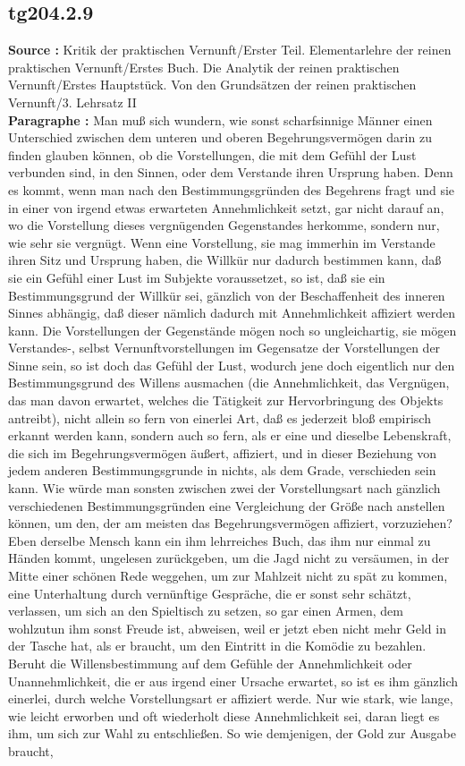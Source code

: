 \documentclass[a4paper,12pt,twoside]{book}
\begin{document}
	\subsection*{tg204.2.9} 
	\textbf{Source : }Kritik der praktischen Vernunft/Erster Teil. Elementarlehre der reinen praktischen Vernunft/Erstes Buch. Die Analytik der reinen praktischen Vernunft/Erstes Hauptstück. Von den Grundsätzen der reinen praktischen Vernunft/3. Lehrsatz II\\  
	
	\noindent\textbf{Paragraphe : }Man muß sich wundern, wie sonst scharfsinnige Männer einen Unterschied zwischen dem unteren und oberen Begehrungsvermögen darin zu finden glauben können, ob die Vorstellungen, die mit dem Gefühl der Lust verbunden sind, in den Sinnen, oder dem Verstande ihren Ursprung haben. Denn es kommt, wenn man nach den Bestimmungsgründen des Begehrens fragt und sie in einer von irgend etwas erwarteten Annehmlichkeit setzt, gar nicht darauf an, wo die Vorstellung dieses vergnügenden Gegenstandes herkomme, sondern nur, wie sehr sie vergnügt. Wenn eine Vorstellung, sie mag immerhin im Verstande ihren Sitz und Ursprung haben, die Willkür nur dadurch bestimmen  kann, daß sie ein Gefühl einer Lust im Subjekte voraussetzet, so ist, daß sie ein Bestimmungsgrund der Willkür sei, gänzlich von der Beschaffenheit des inneren Sinnes abhängig, daß dieser nämlich dadurch mit Annehmlichkeit affiziert werden kann. Die Vorstellungen der Gegenstände mögen noch so ungleichartig, sie mögen Verstandes-, selbst Vernunftvorstellungen im Gegensatze der Vorstellungen der Sinne sein, so ist doch das Gefühl der Lust, wodurch jene doch eigentlich nur den Bestimmungsgrund des Willens ausmachen (die Annehmlichkeit, das Vergnügen, das man davon erwartet, welches die Tätigkeit zur Hervorbringung des Objekts antreibt), nicht allein so fern von einerlei Art, daß es jederzeit bloß empirisch erkannt werden kann, sondern auch so fern, als er eine und dieselbe Lebenskraft, die sich im Begehrungsvermögen äußert, affiziert, und in dieser Beziehung von jedem anderen Bestimmungsgrunde in nichts, als dem Grade, verschieden sein kann. Wie würde man sonsten zwischen zwei der Vorstellungsart nach gänzlich verschiedenen Bestimmungsgründen eine Vergleichung der Größe nach anstellen können, um den, der am meisten das Begehrungsvermögen affiziert, vorzuziehen? Eben derselbe Mensch kann ein ihm lehrreiches Buch, das ihm nur einmal zu Händen kommt, ungelesen zurückgeben, um die Jagd nicht zu versäumen, in der Mitte einer schönen Rede weggehen, um zur Mahlzeit nicht zu spät zu kommen, eine Unterhaltung durch vernünftige Gespräche, die er sonst sehr schätzt, verlassen, um sich an den Spieltisch zu setzen, so gar einen Armen, dem wohlzutun ihm sonst Freude ist, abweisen, weil er jetzt eben nicht mehr Geld in der Tasche hat, als er braucht, um den Eintritt in die Komödie zu bezahlen. Beruht die Willensbestimmung auf dem Gefühle der Annehmlichkeit oder Unannehmlichkeit, die er aus irgend einer Ursache erwartet, so ist es ihm gänzlich einerlei, durch welche Vorstellungsart er affiziert werde. Nur wie stark, wie lange, wie leicht erworben und oft wiederholt diese Annehmlichkeit sei, daran liegt es ihm, um sich zur Wahl zu entschließen. So wie demjenigen, der Gold zur Ausgabe  braucht, 
\end{document}
